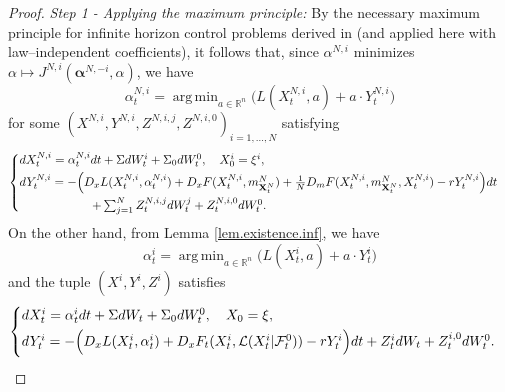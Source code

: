 \documentclass[11pt,reqno]{amsart}
\numberwithin{equation}{section}
\theoremstyle{definition}
\def\R{{\mathbb R}}
\newcommand{\bX}{\mathbf{X}}
\newcommand{\sL}{\mathcal{L}}
\newcommand{\sF}{\mathcal{F}}
\DeclareMathOperator*{\argmin}{arg\,min}
\def \R{\mathbb{R}}
\begin{document}
\begin{proof}
  \textit{Step 1 - Applying the maximum principle:} 
  By the necessary maximum principle for infinite horizon control problems derived in \cite[Section 3.1]{Bayraktar-zhang23} (and applied here with law--independent coefficients), it follows that, since $\alpha^{N,i}$ minimizes $\alpha\mapsto J^{N,i}(\bm \alpha^{N,-i},\alpha)$, we have
  \begin{equation*}
    \alpha^{N,i}_t = \argmin_{a \in \R^n}\big( L(X^{N,i}_t, a) + a\cdot Y^{N,i}_t \big) %
  \end{equation*}
  for some $(X^{N,i}, Y^{N,i}, Z^{N,i,j}, Z^{N,i,0})_{i=1,\dots,N}$ satisfying
  \begin{align} \label{nplayermp.inf}
\begin{cases} \vspace{.1cm}
dX_t^{N,i} = \alpha_t^{N,i} dt + \Sigma dW_t^i + \Sigma_0 dW_t^0,\quad X_0^i = \xi^i, \\ \vspace{.1cm}
dY_t^{N,i} = - \Big(D_x L(X_t^{N,i}, \alpha_t^{N,i}) + D_x F(X_t^{N,i}, m_{\bX_t^N}^{N}) + \frac{1}{N} D_m F(X_t^{N,i}, m_{\bX_t^N}^N, X_t^{N,i}) - rY^{N,i}_t \Big) dt  \\ \qquad \qquad \qquad  + \sum_{j = 1}^N Z_t^{N,i,j}  dW_t^j + Z_t^{N,i,0}  dW_t^0.
\end{cases} 
\end{align}
  On the other hand, from Lemma \ref{lem.existence.inf}, we have 
  \begin{equation*}
    \alpha^{i}_t = \argmin_{a \in \R^n}\big( L(X^{i}_t, a) + a\cdot Y^{i}_t \big) %
  \end{equation*}
  and the tuple $(X^i,Y^i,Z^i)$ satisfies 
  \begin{align}
\begin{cases} \vspace{.1cm}
  dX_t^i = \alpha_t^i dt + \Sigma dW_t + \Sigma_0 dW_t^0, \quad  X_0 = \xi, \\ \vspace{.1cm}
  dY_t^i = - \Big(D_x L(X_t^i, \alpha_t^i) + D_x F_t(X_t^i, \sL(X_t^i | \sF_t^0)) - rY^i_t \Big) dt + Z_t^i  dW_t + Z_t^{i,0}  dW_t^0. %
\end{cases}
\end{align}


\end{proof}
\end{document}
